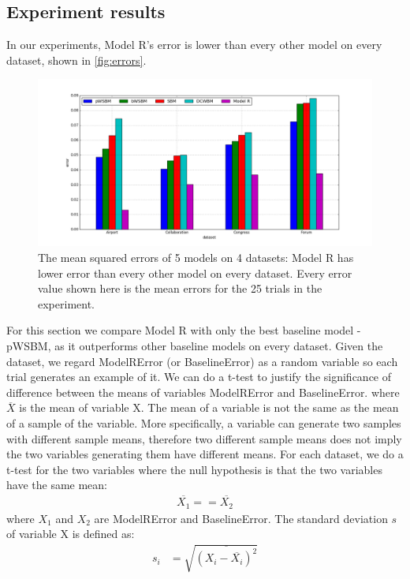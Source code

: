 \documentclass[conference]{IEEEtran}
\begin{document}
\subsection{Experiment results}
In our experiments,
Model R's error is lower than every other model on every dataset,
shown in \autoref{fig:errors}.
\begin{figure}[!htb]\centering
	\includegraphics[width=1\textwidth]{link-weight-errors}
	\caption[content...]{
		The mean squared errors of 5 models on 4 datasets:
		Model R has lower error than every other model on every dataset.
		Every error value shown here is the mean errors for the 25 trials in the experiment.
	}
	\label{fig:errors}
\end{figure}
For this section we compare Model R with only the best baseline model - pWSBM, as it outperforms other baseline models on every dataset.
Given the dataset, we regard ModelRError (or BaselineError) as a random variable so each trial generates an example of it.
We can do a t-test to justify the significance of difference between the means of variables ModelRError and BaselineError.
where $ \overline{X} $ is the mean of variable X.
The mean of a variable is not the same as the mean of a sample of the variable.
More specifically,
a variable can generate two samples with different sample means,
therefore two different sample means does not imply the two variables generating them have different means.
For each dataset, we do a t-test for the two variables where the null hypothesis is that the two variables have the same mean:
\begin{align*}
\overline{X_1} == \overline{X_2}
\end{align*}
where $ X_1 $ and $ X_2 $ are ModelRError and BaselineError.
The standard deviation $ s $ of variable X is defined as:
\begin{align*}
	s_i &= \sqrt{\overline{(X_i - \overline{X_i})^2}}
\end{align*}
\end{document}
